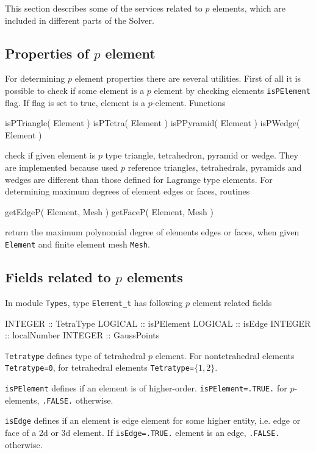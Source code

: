 This section describes some of the services related to $p$ elements, which are included in different parts of the Solver. 

\subsection{Properties of $p$ element}

For determining $p$ element properties there are several utilities. First of all it is possible to check if some element is a $p$ element by checking elements \texttt{isPElement} flag. If flag is set to true, element is a $p$-element. Functions 

\ttbegin
isPTriangle( Element )
isPTetra( Element )
isPPyramid( Element )
isPWedge( Element )
\ttend

\noindent check if given element is $p$ type triangle, tetrahedron, pyramid or wedge. They are implemented because used $p$ reference triangles, tetrahedrals, pyramids and wedges are different than those defined for Lagrange type elements.  For determining maximum degrees of element edges or faces, routines 

\ttbegin
getEdgeP( Element, Mesh )
getFaceP( Element, Mesh )
\ttend 

\noindent return the maximum polynomial degree of elements edges or faces, when given \texttt{Element} and finite element mesh \texttt{Mesh}.

\subsection{Fields related to $p$ elements}

In module \texttt{Types}, type \texttt{Element\_t} has following $p$ element related fields

\ttbegin
INTEGER :: TetraType
LOGICAL :: isPElement
LOGICAL :: isEdge
INTEGER :: localNumber
INTEGER :: GaussPoints 
\ttend

\texttt{Tetratype} defines type of tetrahedral $p$ element. For nontetrahedral elements \texttt{Tetratype=0}, for tetrahedral elements \texttt{Tetratype=}$\{1,2\}$. 

\texttt{isPElement} defines if an element is of higher-order. \texttt{isPElement=.TRUE.} for $p$-elements, \texttt{.FALSE.} otherwise.

\texttt{isEdge} defines if an element is edge element for some higher entity, i.e. edge or face of a 2d or 3d element. If \texttt{isEdge=.TRUE.} element is an edge, \texttt{.FALSE.} otherwise.

